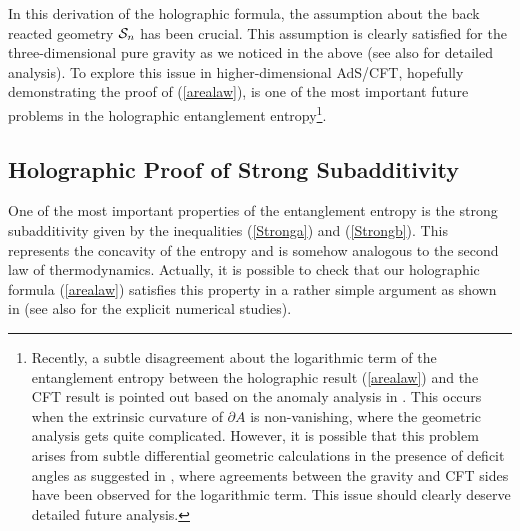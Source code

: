 \documentclass[12pt]{article}
\def\de{\partial}
\begin{document}
In this derivation of the holographic formula, the assumption about the back reacted geometry
${\cal S}_n$ has been crucial. This assumption is clearly satisfied for the three-dimensional pure gravity
as we noticed in the above (see also \cite{Michalogiorgakis:2008kk} for detailed analysis).
To explore this issue in higher-dimensional AdS/CFT, hopefully demonstrating the proof of (\ref{arealaw}),
is one of the most important future problems in
the holographic entanglement entropy\footnote{
Recently, a subtle disagreement
about the logarithmic term of the entanglement entropy
between the holographic result (\ref{arealaw})
and the CFT result is pointed out
based on the anomaly analysis
in \cite{Schwimmer:2008yh}. This occurs
when the extrinsic curvature of $\de A$
is non-vanishing, where the geometric analysis gets quite complicated.
However, it is possible that this problem
arises from subtle differential geometric calculations
in the presence of deficit angles as suggested in
\cite{Solodukhin:2008dh}, where
agreements between the gravity and CFT sides have been
observed for the logarithmic term.
This issue should clearly deserve detailed future analysis.}.

\subsection{Holographic Proof of Strong Subadditivity}
\label{stsub}
\hspace{5mm}
One of the most important properties of the entanglement entropy is the strong subadditivity \cite{LiRu}
given by the inequalities (\ref{Stronga}) and (\ref{Strongb}).
This represents the concavity of the entropy and is somehow analogous to the second law of
thermodynamics. Actually, it is possible to check that our holographic formula (\ref{arealaw})
satisfies this property in a rather simple argument as shown in \cite{Headrick:2007km}
(see also \cite{Hirata:2006jx} for the explicit numerical studies).
\end{document}
